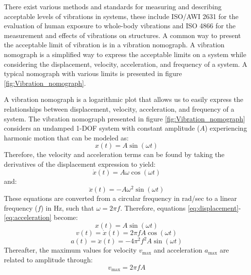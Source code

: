 \documentclass[12pt,letter]{article}
\numberwithin{ex}{section} %
\numberwithin{re}{section} %
\numberwithin{vcs}{section} %
\begin{document}
There exist various methods and standards for measuring and describing acceptable levels of vibrations in systems, these include ISO/AWI 2631 for the evaluation of human exposure to whole-body vibrations and ISO 4866 for the measurement and effects of vibrations on structures. A common way to present the acceptable limit of vibration is in a vibration nomograph.  A vibration nomograph is a simplified way to express the acceptable limits on a system while considering the displacement, velocity, acceleration, and frequency of a system. A typical nomograph with various limits is presented in figure \ref{fig:Vibration_nomograph}. 

A vibration nomograph is a logarithmic plot that allows us to easily express the relationships between displacement, velocity, acceleration, and frequency of a system. The vibration nomograph presented in figure \ref{fig:Vibration_nomograph} considers an undamped 1-DOF system with constant amplitude ($A$) experiencing harmonic motion that can be modeled as:
\begin{equation}
    x(t) = A \sin(\omega t)
    \label{eq:displacement}
\end{equation}
Therefore, the velocity and acceleration terms can be found by taking the derivatives of the displacement expression to yield:
\begin{equation}
    \dot{x}(t) = A \omega \cos(\omega t)
\end{equation}
and:
\begin{equation}
    \ddot{x}(t) = -A\omega^2 \sin(\omega t)
    \label{eq:acceleration}
\end{equation}
These equations are converted from a circular frequency in rad/sec to a linear frequency ($f$) in Hz, such that $\omega = 2\pi f$. Therefore, equations \ref{eq:displacement}-\ref{eq:acceleration} become:
\begin{equation}
    x(t) = A \sin(\omega t)
\end{equation}
\begin{equation}
    v(t) =  \dot{x}(t) = 2\pi f A \cos(\omega t)
\end{equation}
\begin{equation}
    a(t) =  \ddot{x}(t) = -4\pi^2 f^2 A \sin(\omega t)
\end{equation}
Thereafter, the maximum values for velocity $v_\text{max}$ and acceleration $a_\text{max}$ are related to amplitude through:
\begin{equation}
    v_\text{max} = 2\pi f A 
    \label{eq:v_max}
\end{equation}
\end{document}
